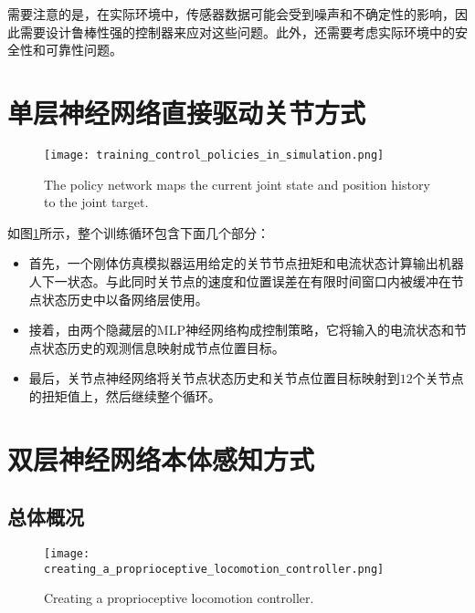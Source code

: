 需要注意的是，在实际环境中，传感器数据可能会受到噪声和不确定性的影响，因此需要设计鲁棒性强的控制器来应对这些问题。此外，还需要考虑实际环境中的安全性和可靠性问题。

\section[单层神经网络直接驱动关节方式]{\label{section:direct_network}单层神经网络直接驱动关节方式\cite[p3]{Hwangbo_Lee_Dosovitskiy_Bellicoso_Tsounis_Koltun_Hutter_2019}}


\begin{figure}
    \centering
    \texttt{[image: training\_control\_policies\_in\_simulation.png]}
    \caption[Training control policies in simulation]{The policy network maps the current joint state and position history to the joint target. }
    \label{fig:training_control_policies_in_simulation}
\end{figure}

如图\ref{fig:training_control_policies_in_simulation}所示，整个训练循环包含下面几个部分：
\begin{itemize}
    \item 首先，一个刚体仿真模拟器运用给定的关节节点扭矩和电流状态计算输出机器人下一状态。与此同时关节点的速度和位置误差在有限时间窗口内被缓冲在节点状态历史中以备网络层使用。
    \item 接着，由两个隐藏层的MLP神经网络构成控制策略，它将输入的电流状态和节点状态历史的观测信息映射成节点位置目标。
    \item 最后，关节点神经网络将关节点状态历史和关节点位置目标映射到$12$个关节点的扭矩值上，然后继续整个循环。
\end{itemize}


\section[双层神经网络本体感知方式]{双层神经网络本体感知方式\cite[p8]{Lee_Hwangbo_Wellhausen_Koltun_Hutter_2020}}

\subsection[总体概况]{总体概况}

\begin{figure}
    \centering
    \texttt{[image: creating\_a\_proprioceptive\_locomotion\_controller.png]}
    \caption{Creating a proprioceptive locomotion controller\cite[p7]{Lee_Hwangbo_Wellhausen_Koltun_Hutter_2020}.}
    \label{fig:creating_a_proprioceptive_locomotion_controller}
\end{figure}

